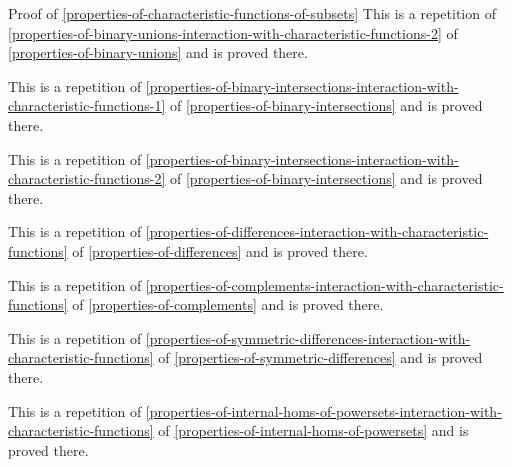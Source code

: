 \begin{Proof}{Proof of \cref{properties-of-characteristic-functions-of-subsets}}
    This is a repetition of \cref{properties-of-binary-unions-interaction-with-characteristic-functions-2} of \cref{properties-of-binary-unions} and is proved there.

    This is a repetition of \cref{properties-of-binary-intersections-interaction-with-characteristic-functions-1} of \cref{properties-of-binary-intersections} and is proved there.

    This is a repetition of \cref{properties-of-binary-intersections-interaction-with-characteristic-functions-2} of \cref{properties-of-binary-intersections} and is proved there.

    This is a repetition of \cref{properties-of-differences-interaction-with-characteristic-functions} of \cref{properties-of-differences} and is proved there.

    This is a repetition of \cref{properties-of-complements-interaction-with-characteristic-functions} of \cref{properties-of-complements} and is proved there.

    This is a repetition of \cref{properties-of-symmetric-differences-interaction-with-characteristic-functions} of \cref{properties-of-symmetric-differences} and is proved there.

    This is a repetition of \cref{properties-of-internal-homs-of-powersets-interaction-with-characteristic-functions} of \cref{properties-of-internal-homs-of-powersets} and is proved there.
\end{Proof}
